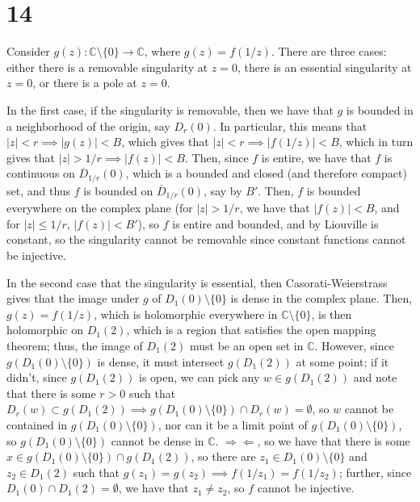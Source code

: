 \documentclass[12pt,letterpaper]{article}
\theoremstyle{definition}
\newcommand{\contra}{\Rightarrow\!\Leftarrow}
\newcommand{\C}{\mathbb{C}}
\begin{document}
\section*{14}

Consider $g(z): \C \setminus \{0\} \rightarrow \C$, where $g(z) = f(1/z)$. There are three cases: either there is a removable singularity at $z = 0$, there is an essential singularity at $z = 0$, or there is a pole at $z = 0$.

In the first case, if the singularity is removable, then we have that $g$ is bounded in a neighborhood of the origin, say $D_{r}(0)$. In particular, this means that $|z| < r \implies |g(z)| < B$, which gives that $|z| < r \implies |f(1/z)| < B$, which in turn gives that $|z| > 1/r \implies |f(z)| < B$. Then, since $f$ is entire, we have that $f$ is continuous on $\overline{D}_{1/r}(0)$, which is a bounded and closed (and therefore compact) set, and thus $f$ is bounded on $\overline{D}_{1/r}(0)$, say by $B'$. Then, $f$ is bounded everywhere on the complex plane (for $|z| > 1/r$, we have that $|f(z)| < B$, and for $|z| \leq 1/r$, $|f(z)| < B'$), so $f$ is entire and bounded, and by Liouville is constant, so the singularity cannot be removable since constant functions cannot be injective.

In the second case that the singularity is essential, then Casorati-Weierstrass gives that the image under $g$ of $D_{1}(0) \setminus \{0\}$ is dense in the complex plane. Then, $g(z) = f(1/z)$, which is holomorphic everywhere in $\C \setminus \{0\}$, is then holomorphic on $D_{1}(2)$, which is a region that satisfies the open mapping theorem; thus, the image of $D_{1}(2)$ must be an open set in $\C$. However, since $g(D_{1}(0) \setminus \{0\})$ is dense, it must intersect $g(D_{1}(2))$ at some point; if it didn't, since $g(D_{1}(2))$ is open, we can pick any $w \in g(D_{1}(2))$ and note that there is some $r > 0$ such that $D_{r}(w) \subset g(D_{1}(2)) \implies g(D_{1}(0) \setminus \{0\}) \cap D_{r}(w) = \emptyset$, so $w$ cannot be contained in $g(D_{1}(0) \setminus \{0\})$, nor can it be a limit point of $g(D_{1}(0) \setminus \{0\})$, so $g(D_{1}(0) \setminus \{0\})$ cannot be dense in $\C$. $\contra$, so we have that there is some $x \in g(D_{1}(0) \setminus \{0\}) \cap g(D_{1}(2))$, so there are $z_{1} \in D_{1}(0) \setminus \{0\}$ and $z_{2} \in D_{1}(2)$ such that $g(z_{1}) = g(z_{2}) \implies f(1/z_{1}) = f(1/z_{2})$; further, since $D_{1}(0) \cap D_{1}(2) = \emptyset$, we have that $z_{1} \neq z_{2}$, so $f$ cannot be injective.
\end{document}
